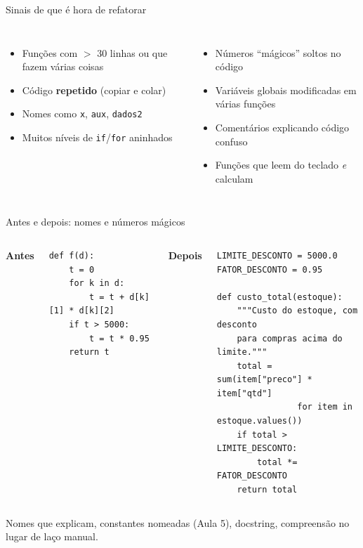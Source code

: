 \documentclass[aspectratio=169,10pt,t]{beamer}
\begin{document}
\begin{frame}{Sinais de que é hora de refatorar}
  \begin{columns}[T]
    \begin{itemize}
      \item Funções com \(>\) 30 linhas ou que fazem várias coisas
      \item Código \textbf{repetido} (copiar e colar)
      \item Nomes como \texttt{x}, \texttt{aux}, \texttt{dados2}
      \item Muitos níveis de \texttt{if}/\texttt{for} aninhados
    \end{itemize}
    \begin{itemize}
      \item Números ``mágicos'' soltos no código
      \item Variáveis globais modificadas em várias funções
      \item Comentários explicando código confuso
      \item Funções que leem do teclado \emph{e} calculam
    \end{itemize}
  \end{columns}
\end{frame}

\begin{frame}[fragile]{Antes e depois: nomes e números mágicos}
  \begin{columns}[T]
    \textbf{Antes}
\begin{lstlisting}[basicstyle=\ttfamily\scriptsize]
def f(d):
    t = 0
    for k in d:
        t = t + d[k][1] * d[k][2]
    if t > 5000:
        t = t * 0.95
    return t
\end{lstlisting}
    \textbf{Depois}
\begin{lstlisting}[basicstyle=\ttfamily\scriptsize]
LIMITE_DESCONTO = 5000.0
FATOR_DESCONTO = 0.95

def custo_total(estoque):
    """Custo do estoque, com desconto
    para compras acima do limite."""
    total = sum(item["preco"] * item["qtd"]
                for item in estoque.values())
    if total > LIMITE_DESCONTO:
        total *= FATOR_DESCONTO
    return total
\end{lstlisting}
  \end{columns}
  \vspace{1ex}
  \small Nomes que explicam, constantes nomeadas (Aula 5), docstring, compreensão no lugar de laço manual.
\end{frame}
\end{document}
